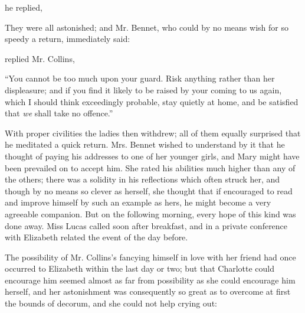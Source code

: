  he replied, 

They were all astonished; and Mr. Bennet, who could by no means wish for so speedy a return, immediately said:


 replied Mr. Collins, 

“You cannot be too much upon your guard. Risk anything rather than her displeasure; and if you find it likely to be raised by your coming to us again, which I should think exceedingly probable, stay quietly at home, and be satisfied that {\em we} shall take no offence.”


With proper civilities the ladies then withdrew; all of them equally surprised that he meditated a quick return. Mrs. Bennet wished to understand by it that he thought of paying his addresses to one of her younger girls, and Mary might have been prevailed on to accept him. She rated his abilities much higher than any of the others; there was a solidity in his reflections which often struck her, and though by no means so clever as herself, she thought that if encouraged to read and improve himself by such an example as hers, he might become a very agreeable companion. But on the following morning, every hope of this kind was done away. Miss Lucas called soon after breakfast, and in a private conference with Elizabeth related the event of the day before.

The possibility of Mr. Collins's fancying himself in love with her friend had once occurred to Elizabeth within the last day or two; but that Charlotte could encourage him seemed almost as far from possibility as she could encourage him herself, and her astonishment was consequently so great as to overcome at first the bounds of decorum, and she could not help crying out:


